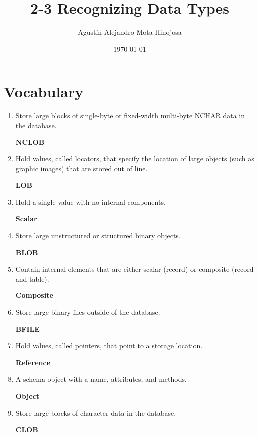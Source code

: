 \documentclass[11pt]{article}
\author{Agustín Alejandro Mota Hinojosa}
\date{\today}
\title{2-3 Recognizing Data Types}
\begin{document}
\maketitle
\tableofcontents

\section{Vocabulary}
\label{sec:orgec26e06}
\begin{enumerate}
\item Store large blocks of single-byte or fixed-width multi-byte NCHAR data in the database.

\textbf{NCLOB}

\item Hold values, called locators, that specify the location of large objects (such as graphic images) that are stored out of line.

\textbf{LOB}

\item Hold a single value with no internal components.

\textbf{Scalar}

\item Store large unstructured or structured binary objects.

\textbf{BLOB}

\item Contain internal elements that are either scalar (record) or composite (record and table).

\textbf{Composite}

\item Store large binary files outside of the database.

\textbf{BFILE}

\item Hold values, called pointers, that point to a storage location.

\textbf{Reference}

\item A schema object with a name, attributes, and methods.

\textbf{Object}

\item Store large blocks of character data in the database.

\textbf{CLOB}
\end{enumerate}
\end{document}
